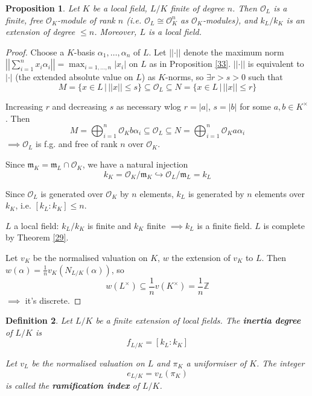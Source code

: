 \documentclass[a4paper]{article}
\newtheorem{definition}{Definition}
\newtheorem{prop}[definition]{Proposition}
\newcommand*\abs[1]{\left|#1\right|}
\newcommand*\norm[1]{\abs{\abs{#1}}}
\begin{document}
\begin{prop}
	Let $K$ be a local field,
	$L/K$ finite of degree $n$.
	Then $\mathcal{O}_L$ is a finite, free $\mathcal{O}_K$-module of rank $n$
	(i.e. $\mathcal{O}_L \cong \mathcal{O}_K^n$ as $\mathcal{O}_K$-modules),
	and $k_L/k_K$ is an extension of degree $\leq n$.
	Moreover, $L$ is a local field.
\end{prop}
\begin{proof}
	Choose a $K$-basis $\alpha_1, \dots, \alpha_n$ of $L$.
	Let $\norm{\cdot}$ denote the maximum norm $\norm{\sum_{i=1}^n x_i \alpha_i} = \max_{i=1,\dots,n}\abs{x_i}$
	on $L$ as in Proposition \ref{33}.
	$\norm{\cdot}$ is equivalent to $\abs{\cdot}$ (the extended absolute value on $L$) as $K$-norms,
	so $\exists r > s > 0$ such that
	$$M = \{x \in L \,|\, \norm{x} \leq s \} \subseteq \mathcal{O}_L \subseteq N = \{x \in L \,|\, \norm{x} \leq r\}$$
	
	Increasing $r$ and decreasing $s$ as necessary wlog $r=\abs{a}$, $s=\abs{b}$ for some $a,b \in K^\times$. Then
	$$M = \bigoplus_{i=1}^n \mathcal{O}_K b\alpha_i \subseteq \mathcal{O}_L \subseteq N = \bigoplus_{i=1}^n \mathcal{O}_K a \alpha_i$$
	$\implies \mathcal{O}_L$ is f.g. and free of rank $n$ over $\mathcal{O}_K$.
	
	Since $\mathfrak{m}_K = \mathfrak{m}_L \cap \mathcal{O}_K$,
	we have a natural injection
	$$k_K = \mathcal{O}_K/\mathfrak{m}_K \hookrightarrow \mathcal{O}_L/\mathfrak{m}_L = k_L$$
	
	Since $\mathcal{O}_L$ is generated over $\mathcal{O}_K$ by $n$ elements,
	$k_L$ is generated by $n$ elements over $k_K$,
	i.e. $[k_L:k_K] \leq n$.
	
	$L$ a local field: $k_L/k_K$ is finite and $k_K$ finite $\implies k_L$ is a finite field.
	$L$ is complete by Theorem \ref{29}.
	
	Let $v_K$ be the normalised valuation on $K$,
	$w$ the extension of $v_K$ to $L$.
	Then $w(\alpha) = \frac{1}{n} v_K (N_{L/K}(\alpha))$, so
	$$w(L^\times) \subseteq \frac{1}{n}v(K^\times) = \frac{1}{n}\mathbb{Z}$$
	$\implies$ it's discrete.
\end{proof}

\begin{definition}
	Let $L/K$ be a finite extension of local fields.
	The \textbf{inertia degree} of $L/K$ is
	$$f_{L/K} = [k_L:k_K]$$
	
	Let $v_L$ be the normalised valuation on $L$ and $\pi_K$ a uniformiser of $K$.
	The integer
	$$e_{L/K} = v_L(\pi_K)$$
	is called the \textbf{ramification index} of $L/K$.
\end{definition}
\end{document}
